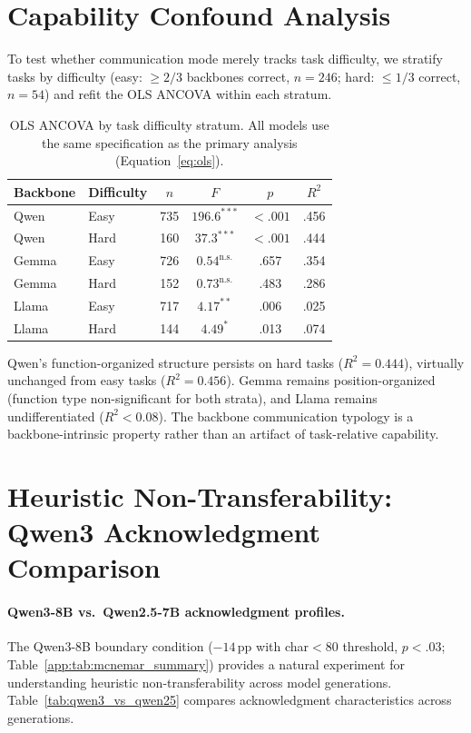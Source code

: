 \section{Capability Confound Analysis}
\label{app:capability-confound}

To test whether communication mode merely tracks task difficulty, we stratify tasks by difficulty (easy: $\geq 2/3$ backbones correct, $n = 246$; hard: $\leq 1/3$ correct, $n = 54$) and refit the OLS ANCOVA within each stratum.

\begin{table}[htbp]
\centering
\caption{OLS ANCOVA by task difficulty stratum. All models use the same specification as the primary analysis (Equation~\ref{eq:ols}).}
\label{tab:capability_confound}
\small
\begin{tabular}{llcccc}
\toprule
\textbf{Backbone} & \textbf{Difficulty} & $n$ & $F$ & $p$ & $R^2$ \\
\midrule
Qwen  & Easy & 735 & $196.6^{***}$ & ${<}.001$ & .456 \\
Qwen  & Hard & 160 & $37.3^{***}$ & ${<}.001$ & .444 \\
\midrule
Gemma & Easy & 726 & $0.54^{\text{n.s.}}$ & .657 & .354 \\
Gemma & Hard & 152 & $0.73^{\text{n.s.}}$ & .483 & .286 \\
\midrule
Llama & Easy & 717 & $4.17^{**}$ & .006 & .025 \\
Llama & Hard & 144 & $4.49^{*}$ & .013 & .074 \\
\bottomrule
\end{tabular}
\end{table}

Qwen's function-organized structure persists on hard tasks ($R^2 = 0.444$), virtually unchanged from easy tasks ($R^2 = 0.456$). Gemma remains position-organized (function type non-significant for both strata), and Llama remains undifferentiated ($R^2 < 0.08$). The backbone communication typology is a backbone-intrinsic property rather than an artifact of task-relative capability.

\section{Heuristic Non-Transferability: Qwen3 Acknowledgment Comparison}
\label{app:qwen3_comparison}

\paragraph{Qwen3-8B vs.\ Qwen2.5-7B acknowledgment profiles.}
The Qwen3-8B boundary condition ($-14$\,pp with char$<$80 threshold, $p < .03$; Table~\ref{app:tab:mcnemar_summary}) provides a natural experiment for understanding heuristic non-transferability across model generations. Table~\ref{tab:qwen3_vs_qwen25} compares acknowledgment characteristics across generations.

